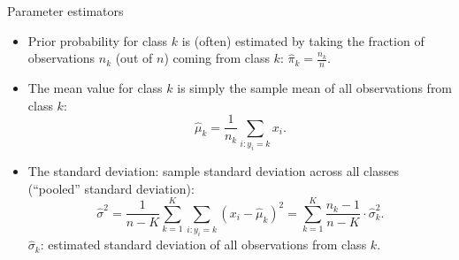 \documentclass[
  10pt,
  ignorenonframetext,
]{beamer}
\begin{document}
\begin{frame}
\begin{block}{Parameter estimators}
\protect\hypertarget{parameter-estimators}{}
\vspace{2mm}

\begin{itemize}
\item
  Prior probability for class \(k\) is (often) estimated by taking the
  fraction of observations \(n_k\) (out of \(n\)) coming from class
  \(k\): \(\hat{\pi}_k = \frac{n_k}{n}.\)
\item
  The mean value for class \(k\) is simply the sample mean of all
  observations from class \(k\):
  \[\hat{\mu}_k = \frac{1}{n_k}\sum_{i:y_i=k} x_i.\]
\item
  The standard deviation: sample standard deviation across all classes
  (``pooled'' standard deviation):
  \[\hat{\sigma}^2=\frac{1}{n-K}\sum_{k=1}^K \sum_{i: y_i=k} (x_i-\hat{\mu}_k)^2 = \sum_{k=1}^K \frac{n_k - 1}{n - K} \cdot \hat{\sigma}_k^2.\]
  \(\hat{\sigma}_k\): estimated standard deviation of all observations
  from class \(k\).
\end{itemize}
\end{block}
\end{frame}
\end{document}

